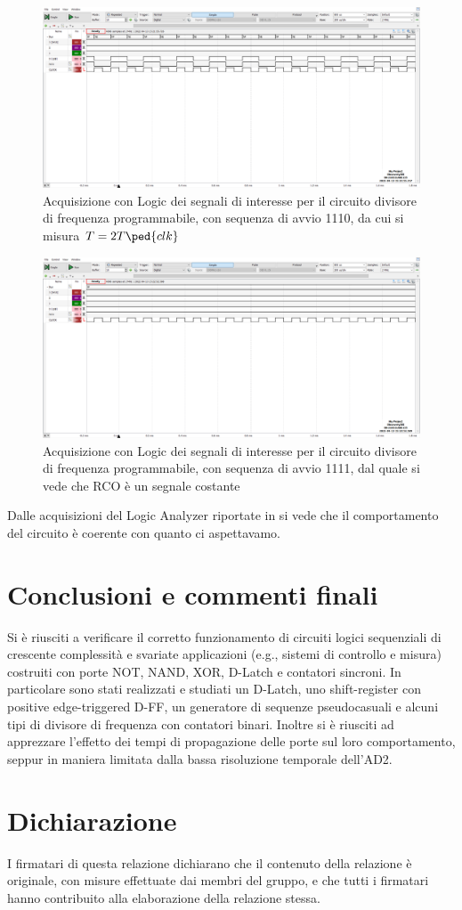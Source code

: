 \documentclass[10pt, a4paper, italian]{article}
\begin{document}
\begin{figure}[htbp]
\centering
	\includegraphics[width=\textwidth]{5.f_1110}
	\caption{Acquisizione con Logic dei segnali di interesse per il circuito divisore di frequenza programmabile, con sequenza di avvio 1110, da cui si misura $T = 2 T\ped{clk}$
	 \label{fig: RCO_1110}}
\end{figure}
\begin{figure}[htbp]
\centering
	\includegraphics[width=\textwidth]{5.f_1111}
	\caption{Acquisizione con Logic dei segnali di interesse per il circuito divisore di frequenza programmabile, con sequenza di avvio 1111, dal quale si vede che RCO è un segnale costante \label{fig: RCO_1111}}
\end{figure}

Dalle acquisizioni del Logic Analyzer riportate in si vede che il comportamento
del circuito è coerente con quanto ci aspettavamo.

\section*{Conclusioni e commenti finali}
Si è riusciti a verificare il corretto funzionamento di circuiti logici
sequenziali di crescente complessità e svariate applicazioni (e.g., sistemi di
controllo e misura) costruiti con porte NOT, NAND, XOR, D-Latch e contatori
sincroni.
In particolare sono stati realizzati e studiati un D-Latch, uno shift-register
con positive edge-triggered D-FF, un generatore di sequenze pseudocasuali e
alcuni tipi di divisore di frequenza con contatori binari.
Inoltre si è riusciti ad apprezzare l'effetto dei tempi di propagazione
delle porte sul loro comportamento, seppur in maniera limitata dalla bassa
risoluzione temporale dell'AD2.

\section*{Dichiarazione}
I firmatari di questa relazione dichiarano che il contenuto della relazione \`e
originale, con misure effettuate dai membri del gruppo, e che tutti i firmatari
hanno contribuito alla elaborazione della relazione stessa.
\end{document}
